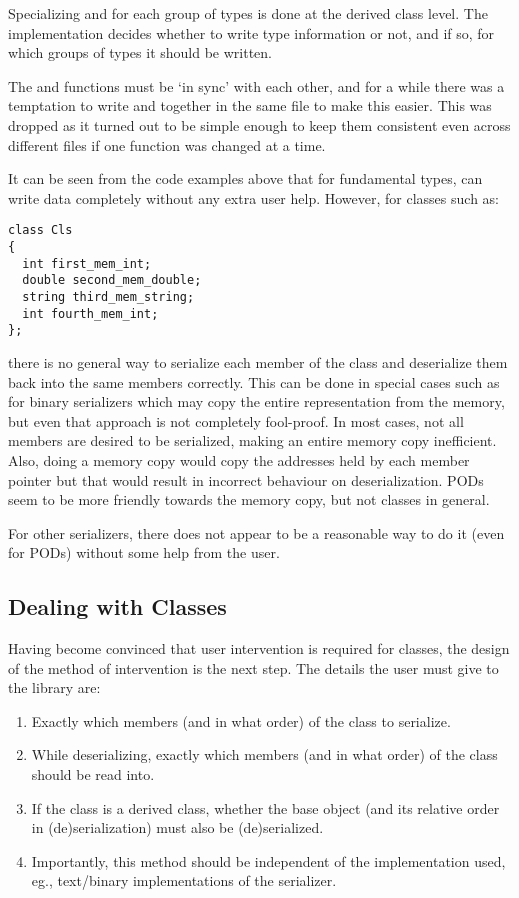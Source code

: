 \documentclass{article}
\begin{document}
Specializing  and  for each group of types is
done at the derived class level. The implementation decides whether to
write type information or not, and if so, for which groups of types it
should be written.

The  and  functions must be `in sync' with each
other, and for a while there was a temptation to write
 and  together in the
same file to make this easier. This was dropped as it turned out to be
simple enough to keep them consistent even across different files if
one function was changed at a time.

It can be seen from the code examples above that for fundamental
types,  can write data completely without any
extra user help. However, for classes such as:

\begin{lstlisting}
class Cls
{
  int first_mem_int;
  double second_mem_double;
  string third_mem_string;
  int fourth_mem_int;
};
\end{lstlisting}

there is no general way to serialize each member of the class and
deserialize them back into the same members correctly. This can be
done in special cases such as for binary serializers which may copy
the entire representation from the memory, but even that approach is
not completely fool-proof. In most cases, not all members are desired
to be serialized, making an entire memory copy inefficient. Also,
doing a memory copy would copy the addresses held by each member
pointer but that would result in incorrect behaviour on
deserialization. PODs seem to be more friendly towards the memory
copy, but not classes in general.

For other serializers, there does not appear to be a reasonable way to
do it (even for PODs) without some help from the user.

\subsection{Dealing with Classes}
Having become convinced that user intervention is required for
classes, the design of the method of intervention is the next step.
The details the user must give to the library are:
\begin{enumerate}
\item Exactly which members (and in what order) of the class to
  serialize.
\item While deserializing, exactly which members (and in what order)
  of the class should be read into.
\item If the class is a derived class, whether the base object (and
  its relative order in (de)serialization) must also be (de)serialized.
\item Importantly, this method should be independent of the
  implementation used, eg., text/binary implementations of the
  serializer.
\end{enumerate}
\end{document}

